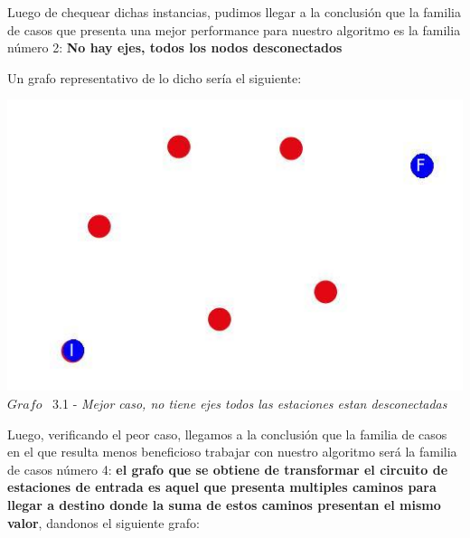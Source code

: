 Luego de chequear dichas instancias, pudimos llegar a la conclusi\'on que la familia de casos que presenta una mejor performance para nuestro algoritmo
es la familia número 2: \textbf{No hay ejes, todos los nodos desconectados}

Un grafo representativo de lo dicho ser\'ia el siguiente:

\vspace*{0.3cm} \vspace*{0.3cm}
  \begin{center}
\includegraphics[scale=0.5]{./EJ3/grafoSinEjes.jpeg}
\\{$Grafo$ \ 3.1 - \textit{Mejor caso, no tiene ejes todos las estaciones estan desconectadas}} 
  \end{center}
  \vspace*{0.3cm}
  
Luego, verificando el peor caso, llegamos a la conclusi\'on que la familia de casos en el que resulta menos beneficioso trabajar con nuestro algoritmo ser\'a la familia de casos número 4: \textbf{el grafo que se obtiene de transformar el circuito de estaciones de entrada es aquel que presenta multiples caminos para llegar a destino donde la suma de estos caminos presentan el mismo valor}, dandonos el siguiente grafo:\\

